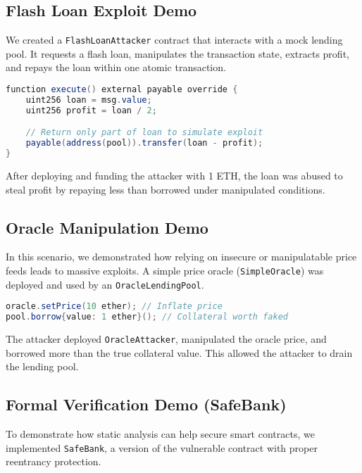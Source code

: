 \documentclass[conference]{IEEEtran}
\begin{document}
\subsection{Flash Loan Exploit Demo}

We created a \texttt{FlashLoanAttacker} contract that interacts with a mock lending pool. It requests a flash loan, manipulates the transaction state, extracts profit, and repays the loan within one atomic transaction.

\begin{lstlisting}[language=Java, caption={Flash loan attack execution}]
function execute() external payable override {
    uint256 loan = msg.value;
    uint256 profit = loan / 2;

    // Return only part of loan to simulate exploit
    payable(address(pool)).transfer(loan - profit);
}
\end{lstlisting}

After deploying and funding the attacker with 1 ETH, the loan was abused to steal profit by repaying less than borrowed under manipulated conditions.

\subsection{Oracle Manipulation Demo}

In this scenario, we demonstrated how relying on insecure or manipulatable price feeds leads to massive exploits. A simple price oracle (\texttt{SimpleOracle}) was deployed and used by an \texttt{OracleLendingPool}.

\begin{lstlisting}[language=Java, caption={Price manipulation using vulnerable oracle}]
oracle.setPrice(10 ether); // Inflate price
pool.borrow{value: 1 ether}(); // Collateral worth faked
\end{lstlisting}

The attacker deployed \texttt{OracleAttacker}, manipulated the oracle price, and borrowed more than the true collateral value. This allowed the attacker to drain the lending pool.

\subsection{Formal Verification Demo (SafeBank)}

To demonstrate how static analysis can help secure smart contracts, we implemented \texttt{SafeBank}, a version of the vulnerable contract with proper reentrancy protection.
\end{document}
